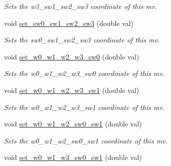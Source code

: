 \begin{DoxyCompactItemize}
\begin{DoxyCompactList}\small\item\em Sets the w3\-\_\-sw1\-\_\-sw2\-\_\-sw3 coordinate of this mv. \end{DoxyCompactList}\item 
\hypertarget{classe3ga_1_1mv_a479588fe07746681d0a5484d6d8fa4f6}{void \hyperlink{classe3ga_1_1mv_a479588fe07746681d0a5484d6d8fa4f6}{set\-\_\-sw0\-\_\-sw1\-\_\-sw2\-\_\-sw3} (double val)}\label{classe3ga_1_1mv_a479588fe07746681d0a5484d6d8fa4f6}

\begin{DoxyCompactList}\small\item\em Sets the sw0\-\_\-sw1\-\_\-sw2\-\_\-sw3 coordinate of this mv. \end{DoxyCompactList}\item 
\hypertarget{classe3ga_1_1mv_a19b6f147621feedd4184205f360ffe48}{void \hyperlink{classe3ga_1_1mv_a19b6f147621feedd4184205f360ffe48}{set\-\_\-w0\-\_\-w1\-\_\-w2\-\_\-w3\-\_\-sw0} (double val)}\label{classe3ga_1_1mv_a19b6f147621feedd4184205f360ffe48}

\begin{DoxyCompactList}\small\item\em Sets the w0\-\_\-w1\-\_\-w2\-\_\-w3\-\_\-sw0 coordinate of this mv. \end{DoxyCompactList}\item 
\hypertarget{classe3ga_1_1mv_a19492461ee1f15e4998bcac51d21a51a}{void \hyperlink{classe3ga_1_1mv_a19492461ee1f15e4998bcac51d21a51a}{set\-\_\-w0\-\_\-w1\-\_\-w2\-\_\-w3\-\_\-sw1} (double val)}\label{classe3ga_1_1mv_a19492461ee1f15e4998bcac51d21a51a}

\begin{DoxyCompactList}\small\item\em Sets the w0\-\_\-w1\-\_\-w2\-\_\-w3\-\_\-sw1 coordinate of this mv. \end{DoxyCompactList}\item 
\hypertarget{classe3ga_1_1mv_ae0a1403a4dd85ac03acad4db3e836e4a}{void \hyperlink{classe3ga_1_1mv_ae0a1403a4dd85ac03acad4db3e836e4a}{set\-\_\-w0\-\_\-w1\-\_\-w2\-\_\-sw0\-\_\-sw1} (double val)}\label{classe3ga_1_1mv_ae0a1403a4dd85ac03acad4db3e836e4a}

\begin{DoxyCompactList}\small\item\em Sets the w0\-\_\-w1\-\_\-w2\-\_\-sw0\-\_\-sw1 coordinate of this mv. \end{DoxyCompactList}\item 
\hypertarget{classe3ga_1_1mv_a82f0786747e7dd76af9c4f3910e617ce}{void \hyperlink{classe3ga_1_1mv_a82f0786747e7dd76af9c4f3910e617ce}{set\-\_\-w0\-\_\-w1\-\_\-w3\-\_\-sw0\-\_\-sw1} (double val)}\label{classe3ga_1_1mv_a82f0786747e7dd76af9c4f3910e617ce}


\end{DoxyCompactItemize}
